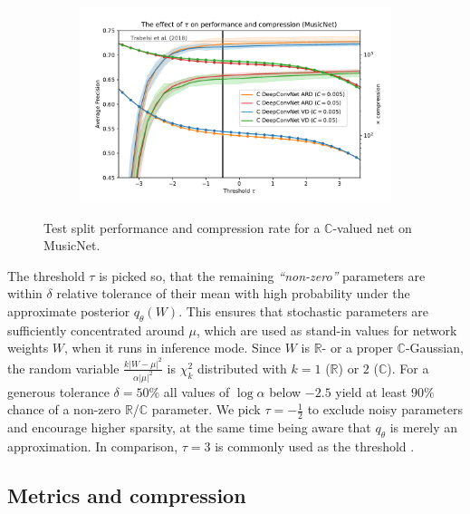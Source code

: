 \documentclass[a4paper,10pt]{article}
\newcommand{\real}{\mathbb{R}}
\newcommand{\cplx}{\mathbb{C}}
\begin{document}
\begin{figure}[!t]
  \centering
  \begin{subfigure}[b]{0.95\textwidth}  %
    \centering
    \includegraphics[width=\columnwidth]{figure__musicnet__threshold.pdf}
  \end{subfigure}
  \caption{%
    Test split performance and compression rate for a $\cplx$-valued net on MusicNet.
  }
  \label{fig:hist__and__threshold__tradeoff}
\end{figure}

The threshold $\tau$ is picked so, that the remaining \textit{``non-zero''} parameters
are within $\delta$ relative tolerance of their mean with high probability under the
approximate posterior $q_\theta(W)$. This ensures that stochastic parameters are sufficiently
concentrated around $\mu$, which are used as stand-in values for network weights $W$,
when it runs in inference mode. Since $W$ is $\real$- or a proper $\cplx$-Gaussian, the
random variable $
  \tfrac{k \lvert W - \mu \rvert^2}
        {\alpha \lvert \mu \rvert^2}
$ is $\chi^2_k$ distributed with $k=1$ ($\real$) or $2$ ($\cplx$).
%
For a generous tolerance $\delta = 50\%$ all values of $\log \alpha$ below $-2.5$ yield
at least $90\%$ chance of a non-zero $\real$/$\cplx$ parameter. We pick $\tau = -\tfrac12$
to exclude noisy parameters and encourage higher sparsity, at the same time being aware
that $q_\theta$ is merely an approximation. In comparison, $\tau = 3$ is commonly used as
the threshold \citep{molchanov_variational_2017,kingma_variational_2015}.



\subsection{Metrics and compression} %
\label{sub:metrics_and_compression}
\end{document}
